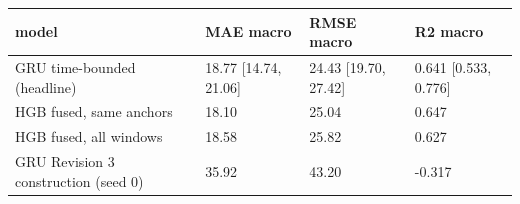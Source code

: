 \begin{tabular}{llll}
\hline
model & MAE macro & RMSE macro & R2 macro \\
\hline
GRU time-bounded (headline) & 18.77 [14.74, 21.06] & 24.43 [19.70, 27.42] & 0.641 [0.533, 0.776] \\
HGB fused, same anchors & 18.10 & 25.04 & 0.647 \\
HGB fused, all windows & 18.58 & 25.82 & 0.627 \\
GRU Revision 3 construction (seed 0) & 35.92 & 43.20 & -0.317 \\
\hline
\end{tabular}
